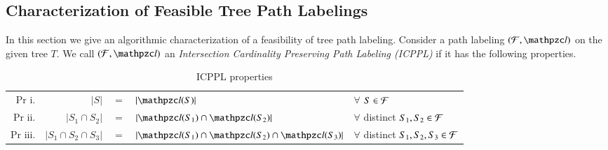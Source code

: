 \documentclass[MS,synopsis]{iitmdiss}
\begin{document}


\subsection{Characterization of Feasible Tree Path  Labelings} 
\label{sec:feasible} 

In this section we give an algorithmic characterization of a
feasibility of tree path labeling.
Consider a path labeling $(\cF, \cl)$ on the
given tree $T$. We call $(\cF, \cl)$ an {\em Intersection Cardinality
  Preserving Path Labeling (ICPPL)} if it has the following
properties.


\begin{table}[h]
  \centering
  \begin{tabular}[l]{rrcll}
    Pr i. & \label{xpr:i} $|S| $&$=$&$ |\cl(S)|$ & $\forall$ $S \in {\cal F}$\\
    Pr ii. & \label{xpr:ii}$|S_1 \cap S_2| $&$=$&$ |\cl(S_1) \cap
    \cl(S_2)|$ &  $\forall$ distinct $S_1, S_2 \in {\cal F}$\\
    Pr iii. & \label{xpr:iii}$|S_1 \cap S_2 \cap S_3| $&$=$&$
    |\cl(S_1) \cap \cl(S_2) \cap \cl(S_3)|$ & $\forall$ distinct $S_1,
    S_2, S_3 \in {\cal F}$ 
  \end{tabular}
  \caption{ICPPL properties}
  \label{tab:icpplpr}
\end{table}
\end{document}
